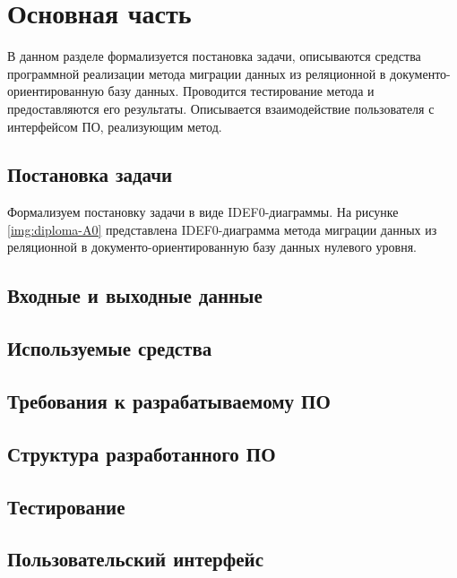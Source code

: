 \chapter{Основная часть}

В данном разделе формализуется постановка задачи, 
описываются средства программной реализации метода 
миграции данных из реляционной в документо-ориентированную базу данных.
Проводится тестирование метода и предоставляются его результаты.
Описывается взаимодействие пользователя с интерфейсом ПО, реализующим метод.



\section{Постановка задачи}
Формализуем постановку задачи в виде IDEF0-диаграммы.
На рисунке \ref{img:diploma-A0} представлена IDEF0-диаграмма метода
миграции данных из реляционной в документо-ориентированную базу данных нулевого уровня.


\section{Входные и выходные данные}

\section{Используемые средства}

\section{Требования к разрабатываемому ПО}

\section{Структура разработанного ПО}

\section{Тестирование}

\section{Пользовательский интерфейс}